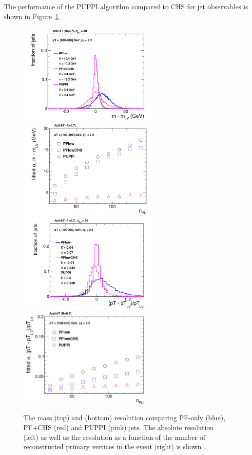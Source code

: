 The performance of the PUPPI algorithm compared to CHS for jet observables is shown in Figure~\ref{fig:objreco:puppi}.

\begin{figure}[h] 
    \centering
    \includegraphics[height=5cm]{figures/event_reconstruction/puppi_mres_hiPt.pdf}
    \includegraphics[height=5cm]{figures/event_reconstruction/puppi_mresVsPu.pdf}\\
    \includegraphics[height=5cm]{figures/event_reconstruction/puppi_ptres_hiPt.pdf}
    \includegraphics[height=5cm]{figures/event_reconstruction/puppi_ptresVsPu.pdf}
    \caption{The mass (top) and \PT (bottom) resolution comparing PF-only (blue), PF+CHS (red) and PUPPI (pink) jets. The absolute resolution (left) as well as the resolution as a function of the number of reconstructed primary vertices in the event (right) is shown~\cite{Bertolini2014}.}
    \label{fig:objreco:puppi}
\end{figure}


